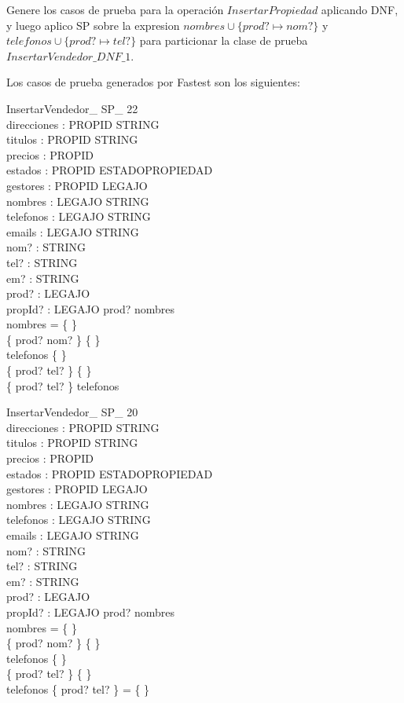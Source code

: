 \documentclass[12pt]{article}
\begin{document}
Genere los casos de prueba para la operación $InsertarPropiedad$ aplicando DNF, y luego aplico SP sobre la expresion $ nombres \cup \{prod? \mapsto nom?\}$ y $telefonos \cup \{prod? \mapsto tel?\}$  para particionar la clase de prueba $InsertarVendedor\_DNF\_1$.

Los casos de prueba generados por Fastest son los siguientes:

\begin{schema}{InsertarVendedor\_ SP\_ 22}\\
 direcciones : PROPID \pfun STRING \\
 titulos : PROPID \pfun STRING \\
 precios : PROPID \pfun \nat \\
 estados : PROPID \pfun ESTADOPROPIEDAD \\
 gestores : PROPID \pfun LEGAJO \\
 nombres : LEGAJO \pfun STRING \\
 telefonos : LEGAJO \pfun STRING \\
 emails : LEGAJO \pfun STRING \\
 nom? : STRING \\
 tel? : STRING \\
 em? : STRING \\
 prod? : LEGAJO \\
 propId? : LEGAJO 
\where
 prod? \notin \dom nombres \\
 nombres = \{ \} \\
 \{ prod? \mapsto nom? \} \neq \{ \} \\
 telefonos \neq \{ \} \\
 \{ prod? \mapsto tel? \} \neq \{ \} \\
 \{ prod? \mapsto tel? \} \subset telefonos
\end{schema}

\begin{schema}{InsertarVendedor\_ SP\_ 20}\\
 direcciones : PROPID \pfun STRING \\
 titulos : PROPID \pfun STRING \\
 precios : PROPID \pfun \nat \\
 estados : PROPID \pfun ESTADOPROPIEDAD \\
 gestores : PROPID \pfun LEGAJO \\
 nombres : LEGAJO \pfun STRING \\
 telefonos : LEGAJO \pfun STRING \\
 emails : LEGAJO \pfun STRING \\
 nom? : STRING \\
 tel? : STRING \\
 em? : STRING \\
 prod? : LEGAJO \\
 propId? : LEGAJO 
\where
 prod? \notin \dom nombres \\
 nombres = \{ \} \\
 \{ prod? \mapsto nom? \} \neq \{ \} \\
 telefonos \neq \{ \} \\
 \{ prod? \mapsto tel? \} \neq \{ \} \\
 telefonos \cap \{ prod? \mapsto tel? \} = \{ \}
\end{schema}
\end{document}
